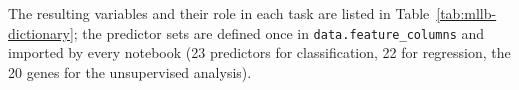 \begin{table}[H]
\centering
\caption{Patients removed at each cleaning step.}
\label{tab:mllb-cleaning}

\end{table}

The resulting variables and their role in each task are listed in Table~\ref{tab:mllb-dictionary};
the predictor sets are defined once in \texttt{data.\allowbreak{}feature\_\allowbreak{}columns} and imported by every notebook
(23 predictors for classification, 22 for regression, the 20 genes for the unsupervised analysis).

\begin{table}[H]
\centering
\caption{Data dictionary of the clean dataset.}
\label{tab:mllb-dictionary}
\resizebox{\textwidth}{!}{}
\end{table}
